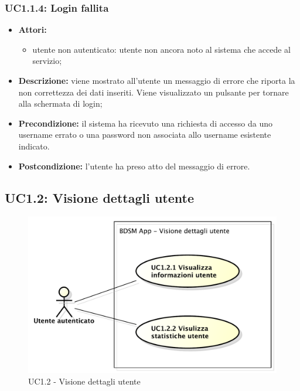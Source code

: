 \subsubsection{UC1.1.4: Login fallita}

\begin{itemize}
	\item \textbf{Attori:}
	\begin{itemize}
		\item utente non autenticato: utente non ancora noto al sistema che accede al servizio;
	\end{itemize}
	\item \textbf{Descrizione:} viene mostrato all'utente un messaggio di errore che riporta la non correttezza dei dati inseriti. Viene visualizzato un pulsante per tornare alla schermata di login;
	\item \textbf{Precondizione:} il sistema ha ricevuto una richiesta di accesso da uno username errato o una password non associata allo username esistente indicato.
	\item \textbf{Postcondizione:} l'utente ha preso atto del messaggio di errore.
\end{itemize}

\pagebreak

\subsection{UC1.2: Visione dettagli utente}

\begin{figure}[htbp]
	\centering
	\centerline{\includegraphics[scale=0.45]{./images/UC1_2.pdf}}
	\caption{UC1.2 - Visione dettagli utente}
\end{figure}

